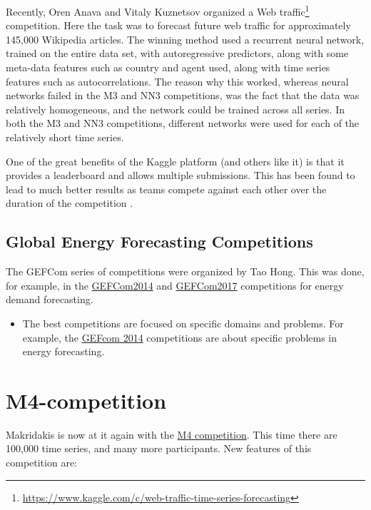 \documentclass[11pt,a4paper,]{article}
\providecommand{\tightlist}{%
  \setlength{\itemsep}{0pt}\setlength{\parskip}{0pt}}
\begin{document}
Recently, Oren Anava and Vitaly Kuznetsov organized a Web traffic\footnote{\url{https://www.kaggle.com/c/web-traffic-time-series-forecasting}} competition. Here the task was to forecast future web traffic for approximately 145,000 Wikipedia articles. The winning method used a recurrent neural network, trained on the entire data set, with autoregressive predictors, along with some meta-data features such as country and agent used, along with time series features such as autocorrelations. The reason why this worked, whereas neural networks failed in the M3 and NN3 competitions, was the fact that the data was relatively homogeneous, and the network could be trained across all series. In both the M3 and NN3 competitions, different networks were used for each of the relatively short time series.

One of the great benefits of the Kaggle platform (and others like it) is that it provides a leaderboard and allows multiple submissions. This has been found to lead to much better results as teams compete against each other over the duration of the competition \autocite{AH11}.

\hypertarget{global-energy-forecasting-competitions}{%
\subsection{Global Energy Forecasting Competitions}\label{global-energy-forecasting-competitions}}

The GEFCom series of competitions were organized by Tao Hong.
This was done, for example, in the \href{http://www.drhongtao.com/gefcom/2014}{GEFCom2014} and \href{http://www.drhongtao.com/gefcom/2017}{GEFCom2017} competitions for energy demand forecasting.

\begin{itemize}
\tightlist
\item
  The best competitions are focused on specific domains and problems. For example, the \href{http://www.gefcom.org}{GEFcom 2014} competitions are about specific problems in energy forecasting.
\end{itemize}

\hypertarget{m4-competition}{%
\section{M4-competition}\label{m4-competition}}

Makridakis is now at it again with the \href{https://www.m4.unic.ac.cy/}{M4 competition}. This time there are 100,000 time series, and many more participants. New features of this competition are:
\end{document}
